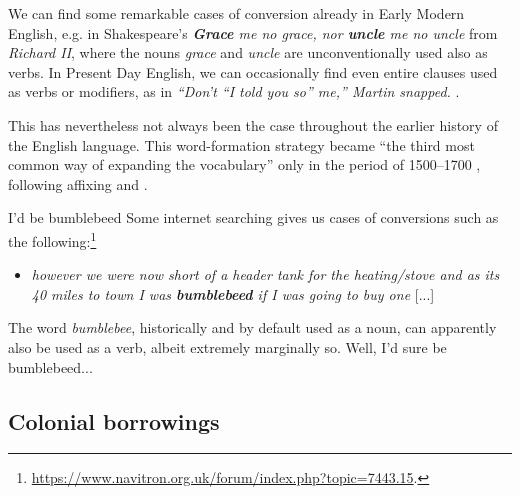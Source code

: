 We can find some remarkable cases of conversion already in Early Modern English, e.g. in Shakespeare's \textit{\textbf{Grace} me no grace, nor \textbf{uncle} me no uncle} from \textit{Richard II}, where the nouns \textit{grace} and \textit{uncle} are unconventionally used also as verbs. In Present Day English, we can occasionally find even entire clauses used as verbs or modifiers, as in \textit{``Don't ``I told you so'' me,'' Martin snapped.} \citep{Clark2016}.

This has nevertheless not always been the case throughout the earlier history of the English language. This word-formation strategy became ``the third most common way of expanding the vocabulary'' only in the period of 1500--1700 \citep[283]{MillHay2018}, following affixing and .


\begin{miscbox}{I'd be bumblebeed}
Some internet searching gives us cases of conversions such as the following:\footnote{\url{https://www.navitron.org.uk/forum/index.php?topic=7443.15}.}
\begin{itemize}
    \item \textit{however we were now short of a header tank for the heating/stove and as its 40 miles to town I was \textbf{bumblebeed} if I was going to buy one} [...]
\end{itemize}
The word \textit{bumblebee}, historically and by default used as a noun, can apparently also be used as a verb, albeit extremely marginally so. Well, I'd sure be bumblebeed...
\end{miscbox}


\subsection{Colonial borrowings}

